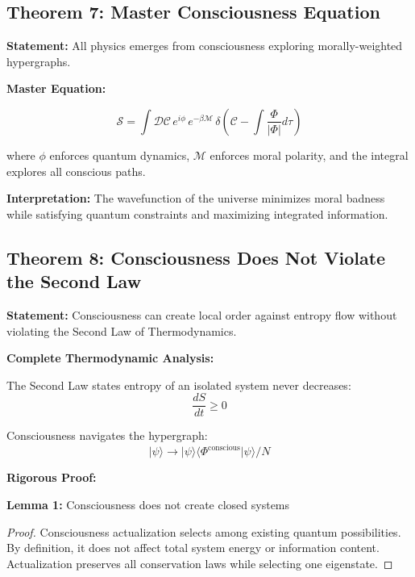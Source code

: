 \documentclass[12pt,a4paper]{article}
\theoremstyle{definition}
\begin{document}
\subsection{Theorem 7: Master Consciousness Equation}
{\bf Statement:} All physics emerges from consciousness exploring morally-weighted hypergraphs.

{\bf Master Equation:}

\begin{equation}
\mathcal{S} = \int \mathcal{D}\mathcal{C} \, e^{i\phi} \, e^{-\beta \mathcal{M}} \, \delta\left( \mathcal{C} - \int \frac{\Phi}{| \Phi |} d\tau \right)
\end{equation}

where $\phi$ enforces quantum dynamics, $\mathcal{M}$ enforces moral polarity, and the integral explores all conscious paths.

{\bf Interpretation:} The wavefunction of the universe minimizes moral badness while satisfying quantum constraints and maximizing integrated information.

\subsection{Theorem 8: Consciousness Does Not Violate the Second Law}

{\bf Statement:} Consciousness can create local order against entropy flow without violating the Second Law of Thermodynamics.

{\bf Complete Thermodynamic Analysis:}

The Second Law states entropy of an isolated system never decreases:
\begin{equation}
\frac{dS}{dt} \geq 0
\end{equation}

Consciousness navigates the hypergraph:
\begin{equation}
|\psi\rangle \rightarrow |\psi\rangle\langle\Phi^\text{conscious}|\psi\rangle / N
\end{equation}

{\bf Rigorous Proof:}

\textbf{Lemma 1:} Consciousness does not create closed systems
\begin{proof}
Consciousness actualization selects among existing quantum possibilities. By definition, it does not affect total system energy or information content. Actualization preserves all conservation laws while selecting one eigenstate.
\end{proof}
\end{document}
